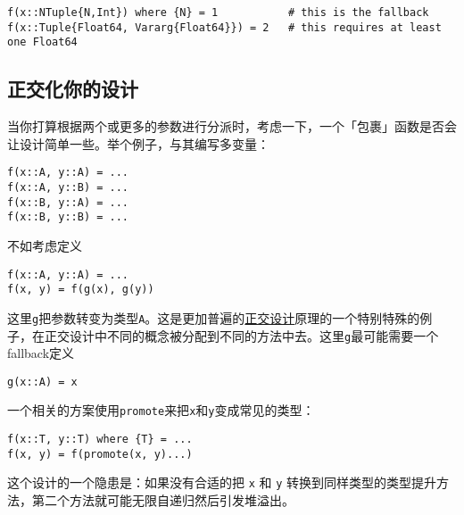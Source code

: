 \begin{verbatim}
f(x::NTuple{N,Int}) where {N} = 1           # this is the fallback
f(x::Tuple{Float64, Vararg{Float64}}) = 2   # this requires at least one Float64
\end{verbatim}



\hypertarget{2934107525015609338}{}


\subsection{正交化你的设计}



当你打算根据两个或更多的参数进行分派时，考虑一下，一个「包裹」函数是否会让设计简单一些。举个例子，与其编写多变量：




\begin{verbatim}
f(x::A, y::A) = ...
f(x::A, y::B) = ...
f(x::B, y::A) = ...
f(x::B, y::B) = ...
\end{verbatim}



不如考虑定义




\begin{verbatim}
f(x::A, y::A) = ...
f(x, y) = f(g(x), g(y))
\end{verbatim}



这里\texttt{g}把参数转变为类型\texttt{A}。这是更加普遍的\href{https://en.wikipedia.org/wiki/Orthogonality\_(programming)}{正交设计}原理的一个特别特殊的例子，在正交设计中不同的概念被分配到不同的方法中去。这里\texttt{g}最可能需要一个fallback定义




\begin{verbatim}
g(x::A) = x
\end{verbatim}



一个相关的方案使用\texttt{promote}来把\texttt{x}和\texttt{y}变成常见的类型：




\begin{verbatim}
f(x::T, y::T) where {T} = ...
f(x, y) = f(promote(x, y)...)
\end{verbatim}



这个设计的一个隐患是：如果没有合适的把 \texttt{x} 和 \texttt{y} 转换到同样类型的类型提升方法，第二个方法就可能无限自递归然后引发堆溢出。



